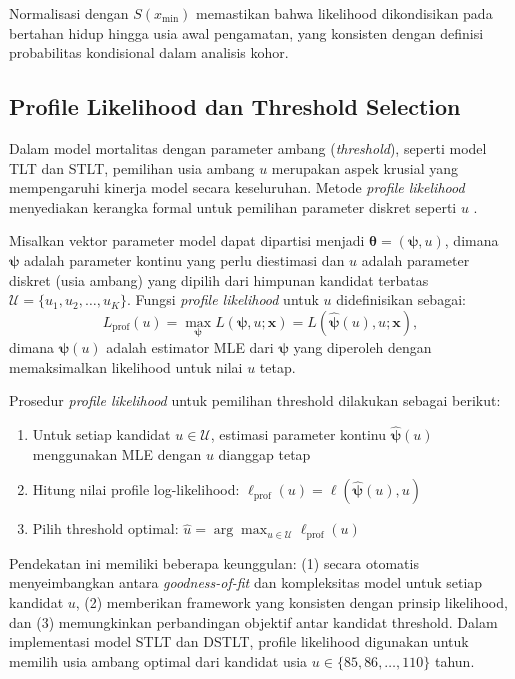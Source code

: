 Normalisasi dengan $S(x_{\min})$ memastikan bahwa likelihood dikondisikan pada bertahan hidup hingga usia awal pengamatan, yang konsisten dengan definisi probabilitas kondisional dalam analisis kohor.

\subsection{Profile Likelihood dan Threshold Selection}

Dalam model mortalitas dengan parameter ambang (\textit{threshold}), seperti model TLT dan STLT, pemilihan usia ambang $u$ merupakan aspek krusial yang mempengaruhi kinerja model secara keseluruhan. Metode \textit{profile likelihood} menyediakan kerangka formal untuk pemilihan parameter diskret seperti $u$ \citep{murphy2000likelihood}.

Misalkan vektor parameter model dapat dipartisi menjadi $\boldsymbol{\theta} = (\boldsymbol{\psi}, u)$, dimana $\boldsymbol{\psi}$ adalah parameter kontinu yang perlu diestimasi dan $u$ adalah parameter diskret (usia ambang) yang dipilih dari himpunan kandidat terbatas $\mathcal{U} = \{u_1, u_2, \ldots, u_K\}$. Fungsi \textit{profile likelihood} untuk $u$ didefinisikan sebagai:
\begin{equation}
L_{\text{prof}}(u) = \max_{\boldsymbol{\psi}} L(\boldsymbol{\psi}, u; \mathbf{x}) = L(\hat{\boldsymbol{\psi}}(u), u; \mathbf{x}),
\label{eq:profile_likelihood}
\end{equation}
dimana $\hat{\boldsymbol{\psi}}(u)$ adalah estimator MLE dari $\boldsymbol{\psi}$ yang diperoleh dengan memaksimalkan likelihood untuk nilai $u$ tetap.

Prosedur \textit{profile likelihood} untuk pemilihan threshold dilakukan sebagai berikut:
\begin{enumerate}
    \item Untuk setiap kandidat $u \in \mathcal{U}$, estimasi parameter kontinu $\hat{\boldsymbol{\psi}}(u)$ menggunakan MLE dengan $u$ dianggap tetap
    \item Hitung nilai profile log-likelihood: $\ell_{\text{prof}}(u) = \ell(\hat{\boldsymbol{\psi}}(u), u)$
    \item Pilih threshold optimal: $\hat{u} = \arg\max_{u \in \mathcal{U}} \ell_{\text{prof}}(u)$
\end{enumerate}

Pendekatan ini memiliki beberapa keunggulan: (1) secara otomatis menyeimbangkan antara \textit{goodness-of-fit} dan kompleksitas model untuk setiap kandidat $u$, (2) memberikan framework yang konsisten dengan prinsip likelihood, dan (3) memungkinkan perbandingan objektif antar kandidat threshold. Dalam implementasi model STLT dan DSTLT, profile likelihood digunakan untuk memilih usia ambang optimal dari kandidat usia $u \in \{85, 86, \ldots, 110\}$ tahun.

